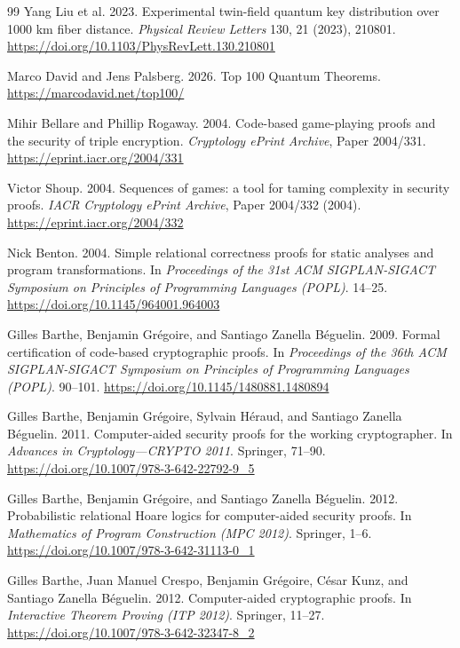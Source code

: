 \documentclass[conference,compsoc]{IEEEtran}
\begin{document}
\begin{thebibliography}{99}
Yang Liu et al.
2023.
Experimental twin-field quantum key distribution over 1000 km fiber distance.
\emph{Physical Review Letters} 130, 21 (2023), 210801.
\url{https://doi.org/10.1103/PhysRevLett.130.210801}

Marco David and Jens Palsberg.
2026.
Top 100 Quantum Theorems.
\url{https://marcodavid.net/top100/}

Mihir Bellare and Phillip Rogaway.
2004.
Code-based game-playing proofs and the security of triple encryption.
\emph{Cryptology ePrint Archive}, Paper 2004/331.
\url{https://eprint.iacr.org/2004/331}

Victor Shoup.
2004.
Sequences of games: a tool for taming complexity in security proofs.
\emph{IACR Cryptology ePrint Archive}, Paper 2004/332 (2004).
\url{https://eprint.iacr.org/2004/332}

Nick Benton.
2004.
Simple relational correctness proofs for static analyses and program transformations.
In \emph{Proceedings of the 31st ACM SIGPLAN-SIGACT Symposium on Principles of Programming Languages (POPL)}. 14--25.
\url{https://doi.org/10.1145/964001.964003}

Gilles Barthe, Benjamin Gr\'egoire, and Santiago Zanella B\'eguelin.
2009.
Formal certification of code-based cryptographic proofs.
In \emph{Proceedings of the 36th ACM SIGPLAN-SIGACT Symposium on Principles of Programming Languages (POPL)}. 90--101.
\url{https://doi.org/10.1145/1480881.1480894}

Gilles Barthe, Benjamin Gr\'egoire, Sylvain H\'eraud, and Santiago Zanella B\'eguelin.
2011.
Computer-aided security proofs for the working cryptographer.
In \emph{Advances in Cryptology---CRYPTO 2011}. Springer, 71--90.
\url{https://doi.org/10.1007/978-3-642-22792-9_5}

Gilles Barthe, Benjamin Gr\'egoire, and Santiago Zanella B\'eguelin.
2012.
Probabilistic relational Hoare logics for computer-aided security proofs.
In \emph{Mathematics of Program Construction (MPC 2012)}. Springer, 1--6.
\url{https://doi.org/10.1007/978-3-642-31113-0_1}

Gilles Barthe, Juan Manuel Crespo, Benjamin Gr\'egoire, C\'esar Kunz, and Santiago Zanella B\'eguelin.
2012.
Computer-aided cryptographic proofs.
In \emph{Interactive Theorem Proving (ITP 2012)}. Springer, 11--27.
\url{https://doi.org/10.1007/978-3-642-32347-8_2}


\end{thebibliography}
\end{document}
